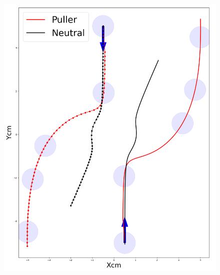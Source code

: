 \documentclass[graybox]{svmult}
\begin{document}
\begin{figure}
	\centering

        \includegraphics[scale=0.2]{Figures/squirmer/squirmers.png}
    

\end{figure}
\end{document}

